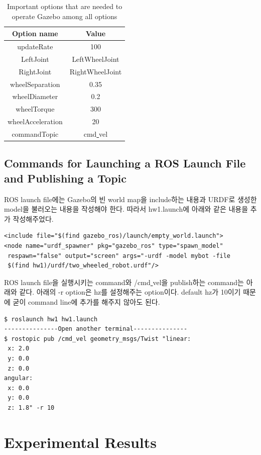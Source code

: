 \documentclass{article}
\begin{document}
\begin{table}[h]
	\centering
	\caption{Important options that are needed to operate Gazebo among all options}
	\begin{tabular}{cc}
		\toprule
		Option name     &  Value   \\ \midrule
		updateRate     & 100 \\
		LeftJoint     & LeftWheelJoint \\
		RightJoint     & RightWheelJoint \\
		wheelSeparation     & 0.35 \\
		wheelDiameter    & 0.2 \\
		wheelTorque     & 300 \\
		wheelAcceleration     & 20 \\
		commandTopic     & cmd\underline{ }vel \\ \bottomrule
	\end{tabular}
	\label{table:rmse}
\end{table}

\subsection{Commands for Launching a ROS Launch File and Publishing a Topic}

ROS launch file에는 Gazebo의 빈 world map을 include하는 내용과 URDF로 생성한 model을 불러오는 내용을 작성해야 한다.
따라서 hw1.launch에 아래와 같은 내용을 추가 작성해주었다.

\begin{lstlisting}
<include file="$(find gazebo_ros)/launch/empty_world.launch">
<node name="urdf_spawner" pkg="gazebo_ros" type="spawn_model"
 respawn="false" output="screen" args="-urdf -model mybot -file
 $(find hw1)/urdf/two_wheeled_robot.urdf"/>
\end{lstlisting}

ROS launch file을 실행시키는 command와 /cmd\underline{ }vel을 publish하는 command는 아래와 같다. 아래의 -r option은 hz를 설정해주는 option이다. default hz가 10이기 때문에 굳이 command line에 추가를 해주지 않아도 된다. 
 
\begin{lstlisting}[frame=single]
$ roslaunch hw1 hw1.launch
---------------Open another terminal---------------
$ rostopic pub /cmd_vel geometry_msgs/Twist "linear:
 x: 2.0
 y: 0.0
 z: 0.0
angular:
 x: 0.0
 y: 0.0
 z: 1.8" -r 10
\end{lstlisting}

\section{Experimental Results}
\end{document}
